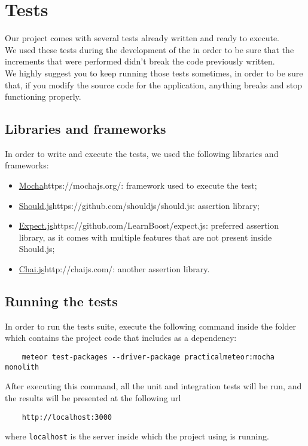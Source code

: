 \section{Tests}
Our project comes with several tests already written and ready to execute. \\
We used these tests during the development of the  in order to be sure that the increments that were performed didn't break the code previously written. \\
We highly suggest you to keep running those tests sometimes, in order to be sure that, if you modify the source code for the application, anything breaks and stop functioning properly. \\


\subsection{Libraries and frameworks}
In order to write and execute the tests, we used the following libraries and frameworks:
\begin{itemize}
	\item \url{Mocha}{https://mochajs.org/}: framework used to execute the test;
	\item \url{Should.js}{https://github.com/shouldjs/should.js}: assertion library;
	\item \url{Expect.js}{https://github.com/LearnBoost/expect.js}: preferred assertion library, as it comes with multiple features that are not present inside Should.js;
	\item \url{Chai.js}{http://chaijs.com/}: another assertion library.
\end{itemize}

\subsection{Running the tests}
In order to run the tests suite, execute the following command inside the folder which contains the  project code that includes  as a dependency:

\begin{lstlisting}
    meteor test-packages --driver-package practicalmeteor:mocha monolith
\end{lstlisting}

After executing this command, all the unit and integration tests will be run, and the results will be presented at the following url

\begin{lstlisting}
    http://localhost:3000
\end{lstlisting}

where \texttt{localhost} is the server inside which the project using  is running.